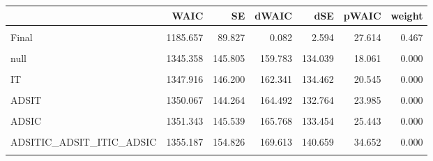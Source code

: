 \documentclass[
  10pt,
  dvipsnames,enabledeprecatedfontcommands]{scrartcl}
\begin{document}
\begin{table}
\centering\begingroup\fontsize{9}{11}\selectfont

\begin{tabular}{lrrrrrr}
\toprule
  & WAIC & SE & dWAIC & dSE & pWAIC & weight\\
\midrule
\cellcolor{gray!6}{tooFar} & \cellcolor{gray!6}{1185.575} & \cellcolor{gray!6}{89.393} & \cellcolor{gray!6}{0.000} & \cellcolor{gray!6}{NA} & \cellcolor{gray!6}{27.846} & \cellcolor{gray!6}{0.487}\\
Final & 1185.657 & 89.827 & 0.082 & 2.594 & 27.614 & 0.467\\
\cellcolor{gray!6}{ADSITICCBS\_ITIC\_ADSIC} & \cellcolor{gray!6}{1190.304} & \cellcolor{gray!6}{87.920} & \cellcolor{gray!6}{4.729} & \cellcolor{gray!6}{6.055} & \cellcolor{gray!6}{25.882} & \cellcolor{gray!6}{0.046}\\
null & 1345.358 & 145.805 & 159.783 & 134.039 & 18.061 & 0.000\\
\cellcolor{gray!6}{ADS} & \cellcolor{gray!6}{1347.281} & \cellcolor{gray!6}{142.655} & \cellcolor{gray!6}{161.706} & \cellcolor{gray!6}{131.261} & \cellcolor{gray!6}{21.935} & \cellcolor{gray!6}{0.000}\\
\addlinespace
IT & 1347.916 & 146.200 & 162.341 & 134.462 & 20.545 & 0.000\\
\cellcolor{gray!6}{ADSITIC\_ADSIC} & \cellcolor{gray!6}{1348.366} & \cellcolor{gray!6}{150.638} & \cellcolor{gray!6}{162.791} & \cellcolor{gray!6}{136.811} & \cellcolor{gray!6}{27.604} & \cellcolor{gray!6}{0.000}\\
ADSIT & 1350.067 & 144.264 & 164.492 & 132.764 & 23.985 & 0.000\\
\cellcolor{gray!6}{ADSIT\_ADSIT} & \cellcolor{gray!6}{1351.139} & \cellcolor{gray!6}{154.826} & \cellcolor{gray!6}{165.564} & \cellcolor{gray!6}{141.033} & \cellcolor{gray!6}{31.062} & \cellcolor{gray!6}{0.000}\\
ADSIC & 1351.343 & 145.539 & 165.768 & 133.454 & 25.443 & 0.000\\
\addlinespace
\cellcolor{gray!6}{ADSITIC} & \cellcolor{gray!6}{1353.020} & \cellcolor{gray!6}{147.645} & \cellcolor{gray!6}{167.445} & \cellcolor{gray!6}{135.441} & \cellcolor{gray!6}{26.884} & \cellcolor{gray!6}{0.000}\\
ADSITIC\_ADSIT\_ITIC\_ADSIC & 1355.187 & 154.826 & 169.613 & 140.659 & 34.652 & 0.000\\
\cellcolor{gray!6}{ADSITIC\_ADSIC\_ADSIT} & \cellcolor{gray!6}{1356.479} & \cellcolor{gray!6}{157.522} & \cellcolor{gray!6}{170.905} & \cellcolor{gray!6}{143.538} & \cellcolor{gray!6}{34.533} & \cellcolor{gray!6}{0.000}\\
\bottomrule
\end{tabular}
\endgroup{}
\end{table}
\end{document}

